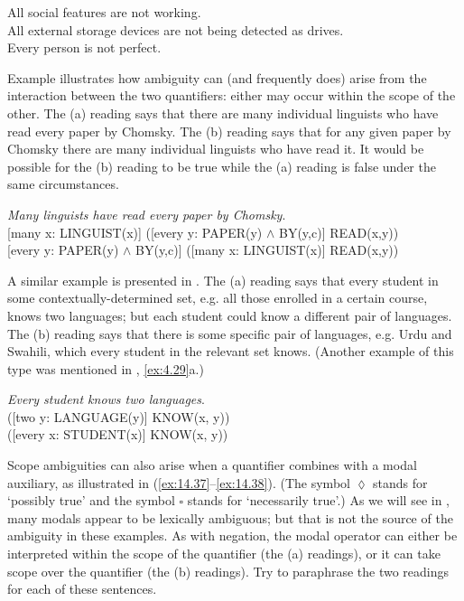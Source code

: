 \ea \label{ex:14.34}
\ea All social features are not working.\\
\ex All external storage devices are not being detected as drives.\\
\ex Every person is not perfect.
                       \z
\z


Example  illustrates how ambiguity can (and frequently does) arise from the interaction between the two quantifiers: either may occur within the scope of the other. The (a) reading says that there are many individual linguists who have read every paper by Chomsky. The (b) reading says that for any given paper by Chomsky there are many individual linguists who have read it. It would be possible for the (b) reading to be true while the (a) reading is false under the same circumstances.


\ea \label{ex:14.35}
\textit{Many linguists have read every paper by Chomsky}.\\
\ea{}  [many x: LINGUIST(x)] ([every y: PAPER(y) $\wedge$ BY(y,c)] READ(x,y))\\
\ex{}  [every y: PAPER(y) $\wedge$ BY(y,c)] ([many x: LINGUIST(x)] READ(x,y))
                       \z
\z


A similar example is presented in . The (a) reading says that every student in some contextually-determined set, e.g. all those enrolled in a certain course, knows two languages; but each student could know a different pair of languages. The (b) reading says that there is some specific pair of languages, e.g. Urdu and Swahili, which every student in the relevant set knows. (Another example of this type was mentioned in , \ref{ex:4.29}a.)


\ea \label{ex:14.36}
\textit{Every student knows two languages}.\\
 ([two y: LANGUAGE(y)] KNOW(x, y))\\
 ([every x: STUDENT(x)] KNOW(x, y))
                       \z
\z


Scope ambiguities can also arise when a quantifier combines with a modal auxiliary, as illustrated in (\ref{ex:14.37}--\ref{ex:14.38}). (The symbol ${\lozenge}$ stands for ‘possibly true’ and the symbol ${\square}$ stands for ‘necessarily true’.) As we will see in , many modals appear to be lexically ambiguous; but that is not the source of the ambiguity in these examples. As with negation, the modal operator can either be interpreted within the scope of the quantifier (the (a) readings), or it can take scope over the quantifier (the (b) readings). Try to paraphrase the two readings for each of these sentences.


